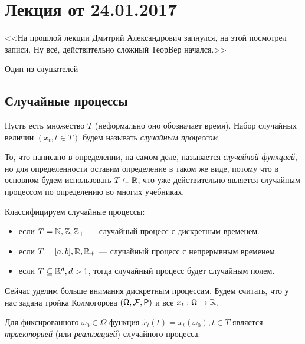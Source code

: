 \section{Лекция от 24.01.2017}

\epigraph{<<На прошлой лекции Дмитрий Александрович запнулся, на этой посмотрел записи. Ну всё, действительно сложный ТеорВер начался.>>}
{Один из слушателей}

\subsection{Случайные процессы}

\begin{definition}
  Пусть есть множество $T$ (неформально оно обозначает время). Набор случайных
  величин $(x_t, t \in T)$ будем называть \emph{случайным процессом.}
\end{definition}

\begin{remark}
  То, что написано в определении, на самом деле, называется \emph{случайной функцией},
  но для определенности оставим определение в таком же виде, потому что в основном
  будем использовать $T \subseteq \mathbb{R}$, что уже действительно является случайным
  процессом по определению во многих учебниках.
\end{remark}

\begin{definition}
  Классифицируем случайные процессы:
  \begin{itemize}
    \item если $T = \mathbb{N}, \mathbb{Z}, \mathbb{Z}_{+}$ --- случайный процесс с дискретным временем.
    \item если $T = [a, b], \mathbb{R}, \mathbb{R}_{+}$ --- случайный процесс с непрерывным
    временем.
    \item если $T \subseteq \mathbb{R}^d, d > 1$, тогда случайный процесс будет случайным
    полем.
  \end{itemize}
\end{definition}

Сейчас уделим больше внимания дискретным процессам. Будем считать, что у нас
задана тройка Колмогорова $(\Omega, \F, \Pr)$ и все $x_t: \Omega \to \mathbb{R}$.

\begin{definition}
  Для фиксированного $\omega_0 \in \Omega$ функция $\tilde{x}_t(t) = x_t(\omega_0), t \in T$
  является \emph{траекторией} (или \emph{реализацией}) случайного процесса.
\end{definition}

